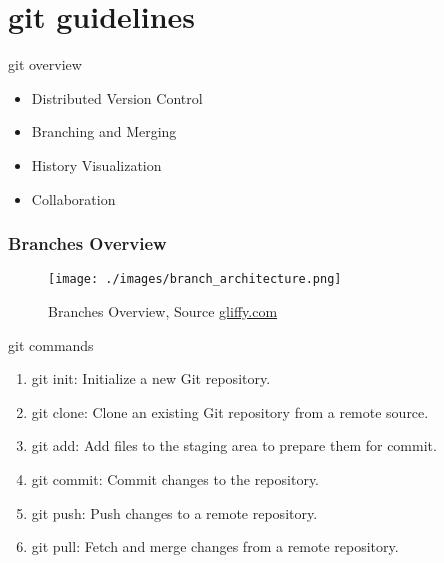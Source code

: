 \section{git guidelines}

\begin{frame}
    \begin{content}{git overview}
        \begin{itemize}
            \item Distributed Version Control
            \item Branching and Merging
            \item History Visualization
            \item Collaboration
        \end{itemize}
    \end{content}
\end{frame}
\begin{frame}
    \frametitle{Branches Overview}
    \begin{figure}    
        \texttt{[image: ./images/branch\_architecture.png]}
        \caption{Branches Overview, Source \href{https://www.gliffy.com/blog/gitflow-diagrams}{gliffy.com}} 
    \end{figure}
\end{frame}

\begin{frame}
    \begin{content}{git commands}
        \begin{enumerate}
            \item git init: Initialize a new Git repository.
            \item git clone: Clone an existing Git repository from a remote source.
            \item git add: Add files to the staging area to prepare them for commit.
            \item git commit: Commit changes to the repository.
            \item git push: Push changes to a remote repository.
            \item git pull: Fetch and merge changes from a remote repository.
        \end{enumerate}
    \end{content}
\end{frame}

